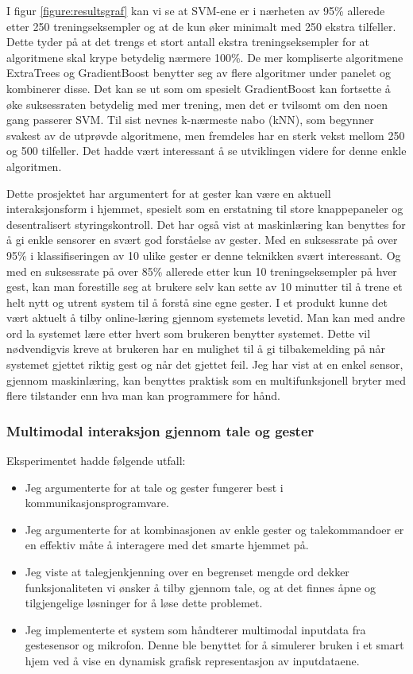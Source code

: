 I figur \ref{figure:resultsgraf} kan vi se at SVM-ene er i nærheten av 95\% allerede etter 250 treningseksempler og at de kun øker minimalt med 250 ekstra tilfeller. Dette tyder på at det trengs et stort antall ekstra treningseksempler for at algoritmene skal krype betydelig nærmere 100\%. De mer kompliserte algoritmene ExtraTrees og GradientBoost benytter seg av flere algoritmer under panelet og kombinerer disse. Det kan se ut som om spesielt GradientBoost kan fortsette å øke suksessraten betydelig med mer trening, men det er tvilsomt om den noen gang passerer SVM. Til sist nevnes k-nærmeste nabo (kNN), som begynner svakest av de utprøvde algoritmene, men fremdeles har en sterk vekst mellom 250 og 500 tilfeller. Det hadde vært interessant å se utviklingen videre for denne enkle algoritmen.

Dette prosjektet har argumentert for at gester kan være en aktuell interaksjonsform i hjemmet, spesielt som en erstatning til store knappepaneler og desentralisert styringskontroll. Det har også vist at maskinlæring kan benyttes for å gi enkle sensorer en svært god forståelse av gester. Med en suksessrate på over 95\% i klassifiseringen av 10 ulike gester er denne teknikken svært interessant. Og med en suksessrate på over 85\% allerede etter kun 10 treningseksempler på hver gest, kan man forestille seg at brukere selv kan sette av 10 minutter til å trene et helt nytt og utrent system til å forstå sine egne gester. I et produkt kunne det vært aktuelt å tilby online-læring gjennom systemets levetid. Man kan med andre ord la systemet lære etter hvert som brukeren benytter systemet. Dette vil nødvendigvis kreve at brukeren har en mulighet til å gi tilbakemelding på når systemet gjettet riktig gest og når det gjettet feil. Jeg har vist at en enkel sensor, gjennom maskinlæring, kan benyttes praktisk som en multifunksjonell bryter med flere tilstander enn hva man kan programmere for hånd.


\subsubsection*{Multimodal interaksjon gjennom tale og gester}
Eksperimentet hadde følgende utfall:
\begin{itemize}
\item Jeg argumenterte for at tale og gester fungerer best i kommunikasjonsprogramvare.
\item Jeg argumenterte for at kombinasjonen av enkle gester og talekommandoer er en effektiv måte å interagere med det smarte hjemmet på.
\item Jeg viste at talegjenkjenning over en begrenset mengde ord dekker funksjonaliteten vi ønsker å tilby gjennom tale, og at det finnes åpne og tilgjengelige løsninger for å løse dette problemet.
\item Jeg implementerte et system som håndterer multimodal inputdata fra gestesensor og mikrofon. Denne ble benyttet for å simulerer bruken i et smart hjem ved å vise en dynamisk grafisk representasjon av inputdataene.
\end{itemize}

